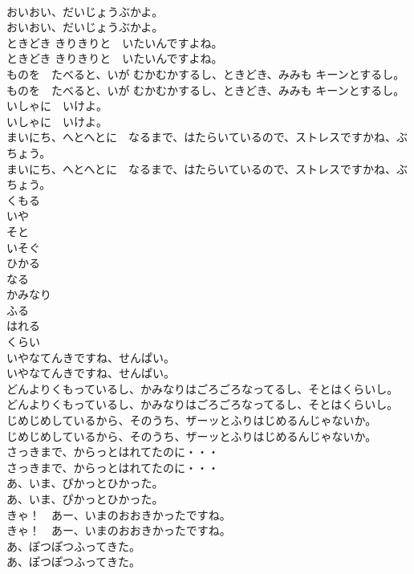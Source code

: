 \documentclass[8pt]{extreport}
\begin{document}
\begin{CJK}{UTF8}{min}
\\	おいおい、だいじょうぶかよ。
\\	おいおい、だいじょうぶかよ。
\\	ときどき きりきりと　いたいんですよね。
\\	ときどき きりきりと　いたいんですよね。
\\	ものを　たべると、いが むかむかするし、ときどき、みみも キーンとするし。
\\	ものを　たべると、いが むかむかするし、ときどき、みみも キーンとするし。
\\	いしゃに　いけよ。
\\	いしゃに　いけよ。
\\	まいにち、へとへとに　なるまで、はたらいているので、ストレスですかね、ぶちょう。
\\	まいにち、へとへとに　なるまで、はたらいているので、ストレスですかね、ぶちょう。
\\	くもる
\\	いや
\\	そと
\\	いそぐ
\\	ひかる
\\	なる
\\	かみなり
\\	ふる
\\	はれる
\\	くらい
\\	いやなてんきですね、せんぱい。
\\	いやなてんきですね、せんぱい。
\\	どんよりくもっているし、かみなりはごろごろなってるし、そとはくらいし。
\\	どんよりくもっているし、かみなりはごろごろなってるし、そとはくらいし。
\\	じめじめしているから、そのうち、ザーッとふりはじめるんじゃないか。
\\	じめじめしているから、そのうち、ザーッとふりはじめるんじゃないか。
\\	さっきまで、からっとはれてたのに・・・
\\	さっきまで、からっとはれてたのに・・・
\\	あ、いま、ぴかっとひかった。
\\	あ、いま、ぴかっとひかった。
\\	きゃ！　あー、いまのおおきかったですね。
\\	きゃ！　あー、いまのおおきかったですね。
\\	あ、ぽつぽつふってきた。
\\	あ、ぽつぽつふってきた。

\end{CJK}
\end{document}
